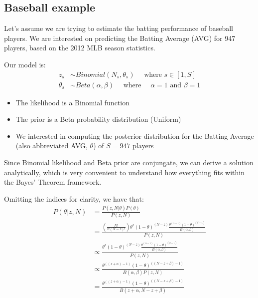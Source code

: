 \documentclass[11pt]{beamer}
\begin{document}
\subsection{Baseball example}
\begin{frame}
	Let's assume we are trying to estimate the batting performance of baseball players. We are interested on predicting the Batting Average (AVG) for 947 players, based on the 2012 MLB season statistics.
\end{frame}

\begin{frame}
	Our model is:
	\begin{align}
	z_s &\sim Binomial(N_s, \theta_s) \quad \text{ where } s \in [1, S]\\
	\theta_s &\sim Beta(\alpha, \beta) \quad \text{ where } \quad \alpha = 1 \text{ and } \beta = 1
	\end{align}
	\begin{itemize}
	\item The likelihood is a Binomial function
	\item The prior is a Beta probability distribution (Uniform)
	\item We interested in computing the posterior distribution for the Batting Average (also abbreviated AVG, $\theta$) of $S = 947$ players
	\end{itemize}
\end{frame}

\begin{frame}
	Since Binomial likelihood and Beta prior are conjungate, we can derive a solution analytically, which is very convenient to understand how everything fits within the Bayes' Theorem framework.	
\end{frame}

\begin{frame}
	Omitting the indices for clarity, we have that:
	\begin{align}
	P(\theta|z, N) &= \frac{P(z, N | \theta) P(\theta)}{P(z, N)} \\
	&= \frac{\left( \frac{N!}{z! (N-z)!} \right) \theta^z (1 - \theta)^{(N-z)} \frac{\theta^{(\alpha - 1)}(1 - \theta)^{(\beta - 1)}}{B(\alpha, \beta)}}{P(z, N)} \label{eq:beta-binomial-definition}\\
	&\propto \frac{\theta^z (1 - \theta)^{(N-z)} \frac{\theta^{(\alpha - 1)}(1 - \theta)^{(\beta - 1)}}{B(\alpha, \beta)}}{P(z, N)} \\
	&\propto \frac{\theta^{((z + \alpha) - 1)} (1 - \theta)^{((N - z + \beta) - 1)} }{B(\alpha, \beta) P(z, N)} \\
	&= \frac{\theta^{((z + \alpha) - 1)} (1 - \theta)^{((N - z + \beta) - 1)} }{B(z + \alpha, N - z + \beta)} \label{eq:posterior_beta_distribution}
	\end{align}
\end{frame}
\end{document}
